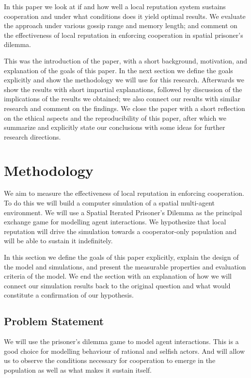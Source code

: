 \documentclass[english]{article}
\begin{document}
In this paper we look at if and how well a local reputation system sustains cooperation and under what conditions does it yield optimal results.
We evaluate the approach under various gossip range and memory length; and comment on the effectiveness of local reputation in enforcing cooperation in spatial prisoner's dilemma.

This was the introduction of the paper, with a short background, motivation, and explanation of the goals of this paper.
In the next section we define the goals explicitly and show the methodology we will use for this research.
Afterwards we show the results with short impartial explanations, followed by discussion of the implications of the results we obtained;
we also connect our results with similar research and comment on the findings.
We close the paper with a short reflection on the ethical aspects and the reproducibility of this paper, after which we summarize and explicitly state our conclusions with some ideas for further research directions.


\section{Methodology}
We aim to measure the effectiveness of local reputation in enforcing cooperation.
To do this we will build a computer simulation of a spatial multi-agent environment.
We will use a Spatial Iterated Prisoner's Dilemma as the principal exchange game for modelling agent interactions.
We hypothesize that local reputation will drive the simulation towards a cooperator-only population and will be able to sustain it indefinitely.

In this section we define the goals of this paper explicitly,
explain the design of the model and simulations,
and present the measurable properties and evaluation criteria of the model.
We end the section with an explanation of how we will connect our simulation results back to the original question
and what would constitute a confirmation of our hypothesis.

\subsection{Problem Statement}
We will use the prisoner's dilemma game to model agent interactions.
This is a good choice for modelling behaviour of rational and selfish actors.
And will allow us to observe the conditions necessary for cooperation to emerge in the population as well as what makes it sustain itself.
\end{document}
